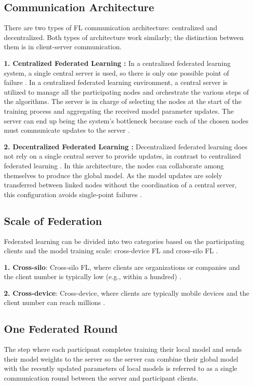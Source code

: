 \subsection{Communication Architecture}
There are two types of FL communication architecture: centralized and decentralized. Both types of architecture work similarly; the distinction between them is in client-server communication. 

\textbf{1. Centralized Federated Learning :}
In a centralized federated learning system, a single central server is used, so there is only one possible point of failure \cite{ar19}.  In a centralized federated learning environment, a central server is utilized to manage all the participating nodes and orchestrate the various steps of the algorithms. The server is in charge of selecting the nodes at the start of the training process and aggregating the received model parameter updates. The server can end up being the system's bottleneck because each of the chosen nodes must communicate updates to the server \cite{ar18}. 

\textbf{2. Decentralized Federated Learning :}
Decentralized federated learning does not rely on a single central server to provide updates, in contrast to centralized federated learning \cite{ar19}. In this architecture, the nodes can collaborate among themselves to produce the global model. As the model updates are solely transferred between linked nodes without the coordination of a central server, this configuration avoids single-point failures \cite{ar21}. 

\subsection{Scale of Federation}
Federated learning can be divided into two categories based on the participating clients and the model training scale: cross-device FL and cross-silo FL \cite{ar20}.

\textbf{1. Cross-silo}: Cross-silo FL, where clients are organizations or companies and the client number is typically low (e.g., within a hundred) \cite{ar20}. 

\textbf{2. Cross-device}: Cross-device, where clients are typically mobile devices and the client number can reach millions \cite{ar20}. 


\subsection{One Federated Round}
The step where each participant completes training their local model and sends their model weights to the server so the server can combine their global model with the recently updated parameters of local models is referred to as a single communication round between the server and participant clients.

